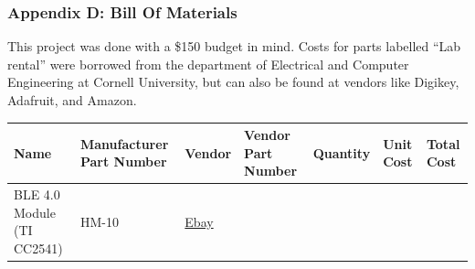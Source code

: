 \documentclass[]{article}
\begin{document}
\hypertarget{appendix-d-bill-of-materials}{%
\subsubsection{Appendix D: Bill Of
Materials}\label{appendix-d-bill-of-materials}}

This project was done with a \$150 budget in mind. Costs for parts labelled ``Lab rental'' were borrowed from the department of Electrical and Computer Engineering at Cornell University, but can also be found at vendors like Digikey, Adafruit, and Amazon.

\begin{longtable}[]{@{}lllllll@{}}
\toprule
\begin{minipage}[b]{0.15\columnwidth}\raggedright
Name\strut
\end{minipage} & \begin{minipage}[b]{0.15\columnwidth}\raggedright
Manufacturer Part Number\strut
\end{minipage} & \begin{minipage}[b]{0.10\columnwidth}\raggedright
Vendor\strut
\end{minipage} & \begin{minipage}[b]{0.17\columnwidth}\raggedright
Vendor Part Number\strut
\end{minipage} & \begin{minipage}[b]{0.11\columnwidth}\raggedright
Quantity\strut
\end{minipage} & \begin{minipage}[b]{0.06\columnwidth}\raggedright
Unit Cost\strut
\end{minipage} & \begin{minipage}[b]{0.07\columnwidth}\raggedright
Total Cost\strut
\end{minipage}\tabularnewline
\midrule
\endhead
\begin{minipage}[t]{0.15\columnwidth}\raggedright
BLE 4.0 Module (TI CC2541)\strut
\end{minipage} & \begin{minipage}[t]{0.15\columnwidth}\raggedright
HM-10\strut
\end{minipage} & \begin{minipage}[t]{0.10\columnwidth}\raggedright
\href{https://www.ebay.com/itm/AT-09-BLE-Bluetooth-4-0-Uart-Transceiver-Module-CC2541-Central-Switching-HM-10/142425748901?ssPageName=STRK\%3AMEBIDX\%3AIT\&_trksid=p2057872.m2749.l2649}{Ebay}\strut
\end{minipage} & \begin{minipage}[t]{0.17\columnwidth}\raggedright

\end{minipage}
\end{longtable}
\end{document}
